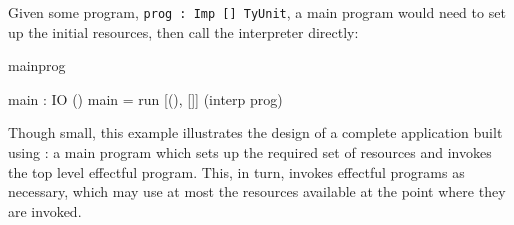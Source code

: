 % 
% 
% 
% 
% 
% 
% 
% 
% 

\noindent
Given some program, \texttt{prog : Imp [] TyUnit}, a main program would need
to set up the initial resources, then call the interpreter directly:

\begin{SaveVerbatim}{mainprog}

main : IO ()
main = run [(), []] (interp prog)

\end{SaveVerbatim}

\noindent
Though small, this example illustrates the design of a complete application
built using \Eff{}: a main program which sets up the required set of resources
and invokes the top level effectful program. This, in turn, invokes effectful
programs as necessary, which may use at most the resources available at the
point where they are invoked.

